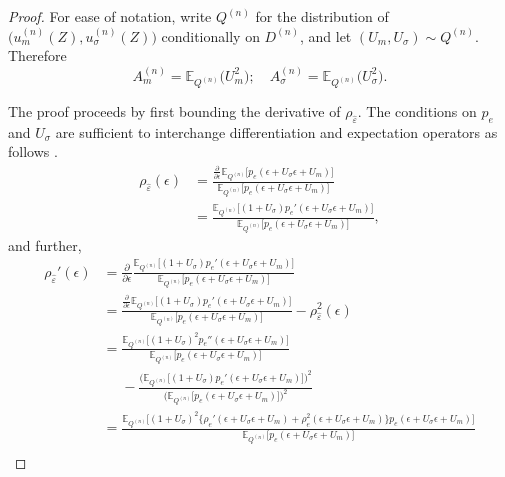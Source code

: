 \documentclass[aos]{imsart}
\newcommand{\E}{\mathbb{E}}
\begin{document}
	\begin{proof}
		For ease of notation, write $Q^{(n)}$ for the distribution of $\big(u_m^{(n)}(Z), u_\sigma^{(n)}(Z)\big)$ conditionally on $D^{(n)}$, and let $(U_m, U_\sigma)\sim Q^{(n)}$. Therefore \begin{equation*}
			A_m^{(n)} = \E_{Q^{(n)}} \big(U_m^2\big); \quad A_\sigma^{(n)} = \E_{Q^{(n)}} \big(U_\sigma^2\big).
		\end{equation*}
		
		The proof proceeds by first bounding the derivative of $\rho_{\hat\varepsilon}$. The conditions on $p_{e}$ and $U_\sigma$ are sufficient to interchange differentiation and expectation operators as follows \citep[Thm.~20.4]{AliprantisAnalysis}. 
		\begin{align*}
			\rho_{\hat\varepsilon}(\epsilon)  &= \frac{\frac{\partial}{\partial \epsilon}\E_{Q^{(n)}}\big[p_{e}(\epsilon + U_\sigma\epsilon + U_m) \big]}{\E_{Q^{(n)}}\big[p_{e}(\epsilon + U_\sigma\epsilon + U_m) \big]}\\
			&=  \frac{\E_{Q^{(n)}}\big[(1+U_\sigma)p_{e}'(\epsilon + U_\sigma\epsilon + U_m) \big]}{\E_{Q^{(n)}}\big[p_{e}(\epsilon + U_\sigma\epsilon + U_m) \big]},
		\end{align*}
		and further,
		\begin{align*}
			\rho_{\hat\varepsilon}'(\epsilon)  &=  \frac{\partial}{\partial \epsilon} \frac{\E_{Q^{(n)}}\big[(1+U_\sigma)p_{e}'(\epsilon + U_\sigma\epsilon + U_m) \big]}{\E_{Q^{(n)}}\big[p_{e}(\epsilon + U_\sigma\epsilon + U_m) \big]}\\
			&=  \frac{\frac{\partial}{\partial \epsilon} \E_{Q^{(n)}}\big[(1+U_\sigma)p_{e}'(\epsilon + U_\sigma\epsilon + U_m) \big]}{\E_{Q^{(n)}}\big[p_{e}(\epsilon + U_\sigma\epsilon + U_m) \big]} - \rho_{\hat\varepsilon}^2(\epsilon)\\
			&= \frac{\E_{Q^{(n)}}\big[ (1+U_\sigma)^2p_{e}''(\epsilon+U_\sigma \epsilon + U_m) \big]}{\E_{Q^{(n)}}\big[ p_{e}(\epsilon+U_\sigma \epsilon + U_m) \big]}\\
			&\phantom{=} - \frac{\Big(\E_{Q^{(n)}}\big[ (1+U_\sigma)p_{e}'(\epsilon+U_\sigma \epsilon + U_m) \big]\Big)^2}{\Big(\E_{Q^{(n)}}\big[ p_{e}(\epsilon+U_\sigma \epsilon + U_m) \big]\Big)^2} \\
			&=\frac{\E_{Q^{(n)}}\big[ (1+U_\sigma)^2\big\{\rho_{e}'(\epsilon+U_\sigma \epsilon + U_m) + \rho_{e}^2(\epsilon+U_\sigma \epsilon + U_m)\big\} p_{e}(\epsilon+U_\sigma \epsilon + U_m) \big]}{\E_{Q^{(n)}}\big[ p_{e}(\epsilon+U_\sigma \epsilon + U_m) \big]}\\

\end{align*}
\end{proof}
\end{document}
